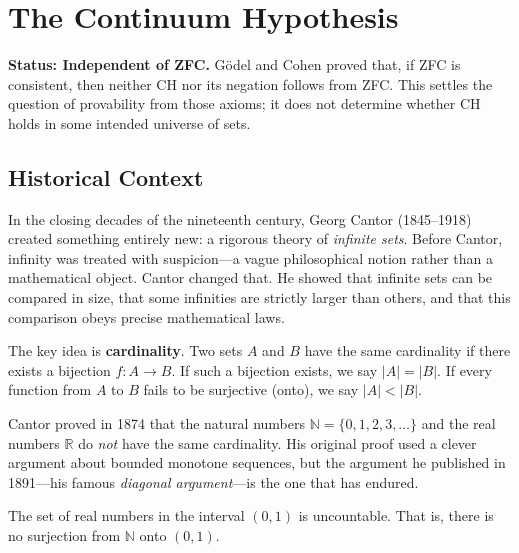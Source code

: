 
\chapter{The Continuum Hypothesis}

\begin{solvedbox}
\textbf{Status: Independent of ZFC.} G\"odel and Cohen proved that, if ZFC is consistent, then neither CH nor its negation follows from ZFC. This settles the question of provability from those axioms; it does not determine whether CH holds in some intended universe of sets.
\end{solvedbox}

\section{Historical Context}

In the closing decades of the nineteenth century, Georg Cantor (1845--1918) created something entirely new: a rigorous theory of \emph{infinite sets}. Before Cantor, infinity was treated with suspicion---a vague philosophical notion rather than a mathematical object. Cantor changed that. He showed that infinite sets can be compared in size, that some infinities are strictly larger than others, and that this comparison obeys precise mathematical laws.

The key idea is \textbf{cardinality}. Two sets $A$ and $B$ have the same cardinality if there exists a bijection $f\colon A \to B$. If such a bijection exists, we say $|A| = |B|$. If every function from $A$ to $B$ fails to be surjective (onto), we say $|A| < |B|$.

Cantor proved in 1874 that the natural numbers $\mathbb{N} = \{0, 1, 2, 3, \ldots\}$ and the real numbers $\mathbb{R}$ do \emph{not} have the same cardinality. His original proof used a clever argument about bounded monotone sequences, but the argument he published in 1891---his famous \emph{diagonal argument}---is the one that has endured.

\begin{theorem}
\label{thm:diagonal}
The set of real numbers in the interval $(0,1)$ is uncountable. That is, there is no surjection from $\mathbb{N}$ onto $(0,1)$.
\end{theorem}

